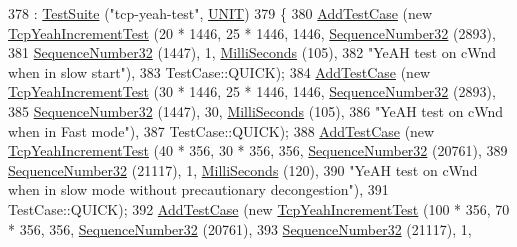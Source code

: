 \begin{DoxyCode}
378                       : \hyperlink{classns3_1_1TestSuite_a904b0c40583b744d30908aeb94636d1a}{TestSuite} (\textcolor{stringliteral}{"tcp-yeah-test"}, \hyperlink{classns3_1_1TestSuite_a1ebfcab34ec8161e085e8e3a1855eae0a3885375a3787abf60431f8454b3cadbd}{UNIT})
379   \{
380     \hyperlink{classns3_1_1TestCase_a3718088e3eefd5d6454569d2e0ddd835}{AddTestCase} (\textcolor{keyword}{new} \hyperlink{classTcpYeahIncrementTest}{TcpYeahIncrementTest} (20 * 1446, 25 * 1446, 1446, 
      \hyperlink{classns3_1_1SequenceNumber}{SequenceNumber32} (2893),
381                                            \hyperlink{classns3_1_1SequenceNumber}{SequenceNumber32} (1447), 1, 
      \hyperlink{group__timecivil_gaf26127cf4571146b83a92ee18679c7a9}{MilliSeconds} (105),
382                                            \textcolor{stringliteral}{"YeAH test on cWnd when in slow start"}),
383                  TestCase::QUICK);
384     \hyperlink{classns3_1_1TestCase_a3718088e3eefd5d6454569d2e0ddd835}{AddTestCase} (\textcolor{keyword}{new} \hyperlink{classTcpYeahIncrementTest}{TcpYeahIncrementTest} (30 * 1446, 25 * 1446, 1446, 
      \hyperlink{classns3_1_1SequenceNumber}{SequenceNumber32} (2893),
385                                            \hyperlink{classns3_1_1SequenceNumber}{SequenceNumber32} (1447), 30, 
      \hyperlink{group__timecivil_gaf26127cf4571146b83a92ee18679c7a9}{MilliSeconds} (105),
386                                            \textcolor{stringliteral}{"YeAH test on cWnd when in Fast mode"}),
387                  TestCase::QUICK);
388     \hyperlink{classns3_1_1TestCase_a3718088e3eefd5d6454569d2e0ddd835}{AddTestCase} (\textcolor{keyword}{new} \hyperlink{classTcpYeahIncrementTest}{TcpYeahIncrementTest} (40 * 356, 30 * 356, 356, 
      \hyperlink{classns3_1_1SequenceNumber}{SequenceNumber32} (20761),
389                                            \hyperlink{classns3_1_1SequenceNumber}{SequenceNumber32} (21117), 1, 
      \hyperlink{group__timecivil_gaf26127cf4571146b83a92ee18679c7a9}{MilliSeconds} (120),
390                                            \textcolor{stringliteral}{"YeAH test on cWnd when in slow mode without precautionary
       decongestion"}),
391                  TestCase::QUICK);
392     \hyperlink{classns3_1_1TestCase_a3718088e3eefd5d6454569d2e0ddd835}{AddTestCase} (\textcolor{keyword}{new} \hyperlink{classTcpYeahIncrementTest}{TcpYeahIncrementTest} (100 * 356, 70 * 356, 356, 
      \hyperlink{classns3_1_1SequenceNumber}{SequenceNumber32} (20761),
393                                            \hyperlink{classns3_1_1SequenceNumber}{SequenceNumber32} (21117), 1, 

\end{DoxyCode}
